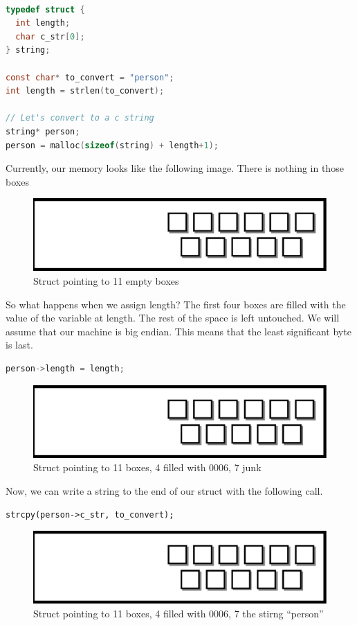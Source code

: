 \begin{lstlisting}[language=C]

typedef struct {
  int length;
  char c_str[0];
} string;

const char* to_convert = "person";
int length = strlen(to_convert);

// Let's convert to a c string
string* person;
person = malloc(sizeof(string) + length+1);
\end{lstlisting}

Currently, our memory looks like the following image.
There is nothing in those boxes

\begin{figure}[H]
\centering
\includegraphics[width=.7\textwidth]{introc/drawings/memory_model_empty.eps}
\caption{Struct pointing to 11 empty boxes}
\end{figure}

So what happens when we assign length?
The first four boxes are filled with the value of the variable at length.
The rest of the space is left untouched.
We will assume that our machine is big endian.
This means that the least significant byte is last.

\begin{lstlisting}[language=C]
person->length = length;
\end{lstlisting}

\begin{figure}[H]
\centering
\includegraphics[width=.7\textwidth]{introc/drawings/memory_model_length.eps}
\caption{Struct pointing to 11 boxes, 4 filled with 0006, 7 junk}
\end{figure}

Now, we can write a string to the end of our struct with the following call.

\begin{verbatim}
strcpy(person->c_str, to_convert);
\end{verbatim}

\begin{figure}[H]
\centering
\includegraphics[width=.7\textwidth]{introc/drawings/memory_model_full.eps}
\caption{Struct pointing to 11 boxes, 4 filled with 0006, 7 the stirng ``person''}
\end{figure}

